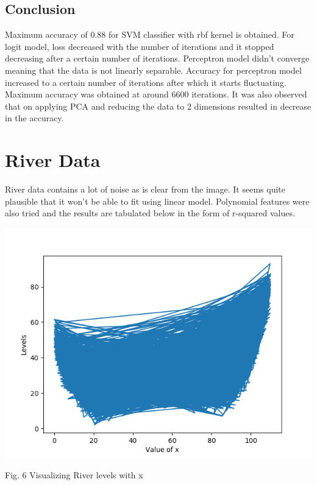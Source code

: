 \documentclass[12pt,journal,compsoc]{IEEEtran}
\begin{document}
\subsection{Conclusion}
\noindent Maximum accuracy of $0.88$ for SVM classifier with rbf kernel is obtained. For logit model, loss decreased with the number of iterations and it stopped decreasing after a certain number of iterations. Perceptron model didn't converge meaning that the data is not linearly separable. Accuracy for perceptron model increased to a certain number of iterations after which it starts fluctuating. Maximum accuracy was obtained at around $6600$ iterations. It was also observed that on applying PCA and reducing the data to 2 dimensions resulted in decrease in the accuracy. 

\section{River Data}
\noindent River data contains a lot of noise as is clear from the image. It seems quite plausible that it won't be able to fit using linear model. Polynomial features were also tried and the results are tabulated below in the form of r-squared values.

\begin{center}
\includegraphics[scale=0.35]{River_dataset.png}

{\small Fig. 6 Visualizing River levels with x}
\end{center}
\end{document}
